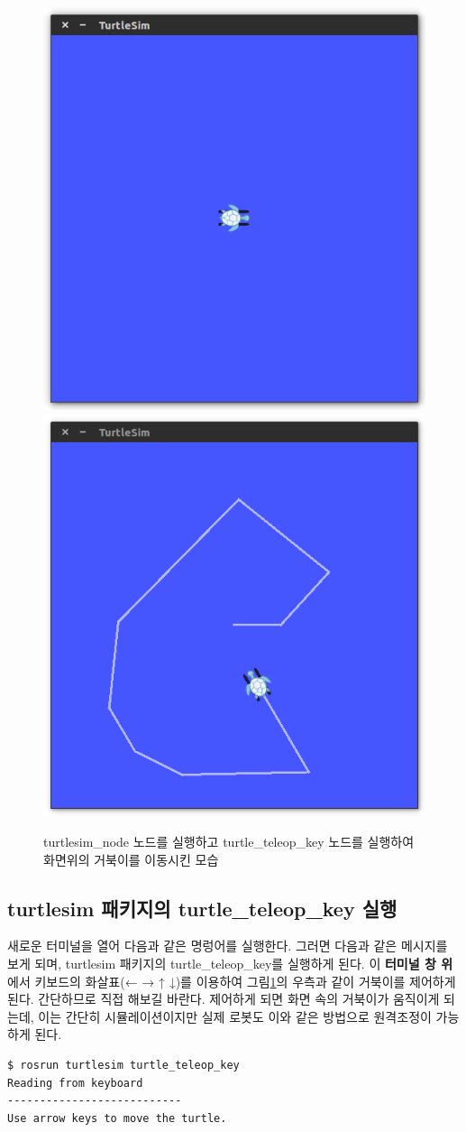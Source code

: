 \begin{figure}[h]
\centering
\includegraphics[width=0.49\columnwidth]{pictures/chapter2/turtlesim_node.png}
\includegraphics[width=0.49\columnwidth]{pictures/chapter2/turtlesim_node_move.png}
\caption{turtlesim\_node 노드를 실행하고 turtle\_teleop\_key 노드를 실행하여 화면위의 거북이를 이동시킨 모습}
\label{fig:turtlesim_node}
\end{figure}

\subsection{turtlesim 패키지의 turtle\_teleop\_key 실행}
새로운 터미널을 열어 다음과 같은 명렁어를 실행한다. 그러면 다음과 같은 메시지를 보게 되며, turtlesim 패키지의 turtle\_teleop\_key를 실행하게 된다. 이 \textbf{터미널 창 위}에서 키보드의 화살표(← → ↑ ↓)를 이용하여 그림\ref{fig:turtlesim_node}의 우측과 같이 거북이를 제어하게 된다. 간단하므로 직접 해보길 바란다. 제어하게 되면 화면 속의 거북이가 움직이게 되는데, 이는 간단히 시뮬레이션이지만 실제 로봇도 이와 같은 방법으로 원격조정이 가능하게 된다.
\\
\begin{lstlisting}[language=ROS]
$ rosrun turtlesim turtle_teleop_key
Reading from keyboard
---------------------------
Use arrow keys to move the turtle.
\end{lstlisting}

